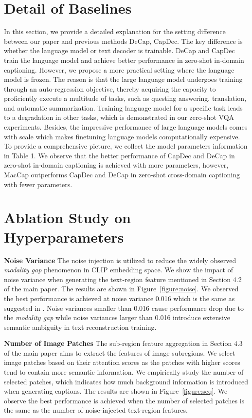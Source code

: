 \section{Detail of Baselines}
In this section, we provide a detailed explanation for the setting difference between our paper and previous methods DeCap\cite{DeCap}, CapDec\cite{CapDec}. The key difference is whether the language model or text decoder is trainable. DeCap and CapDec train the language model and achieve better performance in zero-shot in-domain captioning. However, we propose a more practical setting where the language model is frozen. The reason is that the large language model undergoes training through an auto-regression objective, thereby acquiring the capacity to proficiently execute a multitude of tasks, such as questing answering, translation, and automatic summarization. Training language model for a specific task leads to a degradation in other tasks, which is demonstrated in our zero-shot VQA experiments. Besides, the impressive performance of large language models comes with scale which makes finetuning language models computationally expensive. To provide a comprehensive picture, we collect the model parameters information in Table 1. We observe that the better performance of CapDec and DeCap in zero-shot in-domain captioning is achieved with more parameters, however, MacCap outperforms CapDec and DeCap in zero-shot cross-domain captioning with fewer parameters.

\section{Ablation Study on Hyperparameters}

\textbf{Noise Variance}
The noise injection is utilized to reduce the widely observed \textit{modality gap} phenomenon in CLIP embedding space. We show the impact of noise variance when generating the text-region feature mentioned in Section 4.2 of the main paper. The results are shown in Figure~\ref{figure:noise}. We observed the best performance is achieved at noise variance 0.016 which is the same as suggested in \cite{CapDec}. Noise variances smaller than 0.016 cause performance drop due to the \textit{modality gap} while noise variances larger than 0.016 introduce extensive semantic ambiguity in text reconstruction training.

\textbf{Number of Image Patches}
The sub-region feature aggregation in Section 4.3 of the main paper aims to extract the features of image subregions. We select image patches based on their attention scores as the patches with higher scores tend to contain more semantic information. We empirically study the number of selected patches, which indicates how much background information is introduced when generating captions. The results are shown in Figure~\ref{figure:seq}. We observe the best performance is achieved when the number of selected patches is the same as the number of noise-injected text-region features.


